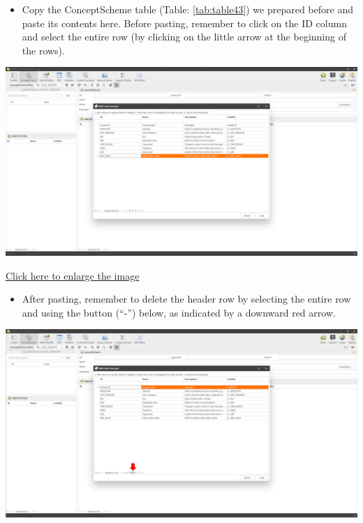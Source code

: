 \documentclass[
]{book}
\providecommand{\tightlist}{%
  \setlength{\itemsep}{0pt}\setlength{\parskip}{0pt}}
\begin{document}
\begin{itemize}
\tightlist
\item
  Copy the ConceptScheme table (Table: \ref{tab:table43}) we prepared before and paste its contents here. Before pasting, remember to click on the ID column and select the entire row (by clicking on the little arrow at the beginning of the rows).
\end{itemize}

\begin{center}\includegraphics[width=1\linewidth]{./images/image106} \end{center}

\href{images/image106.png}{Click here to enlarge the image}

\begin{itemize}
\tightlist
\item
  After pasting, remember to delete the header row by selecting the entire row and using the button (``-'') below, as indicated by a downward red arrow.
\end{itemize}

\begin{center}\includegraphics[width=1\linewidth]{./images/image108} \end{center}
\end{document}
